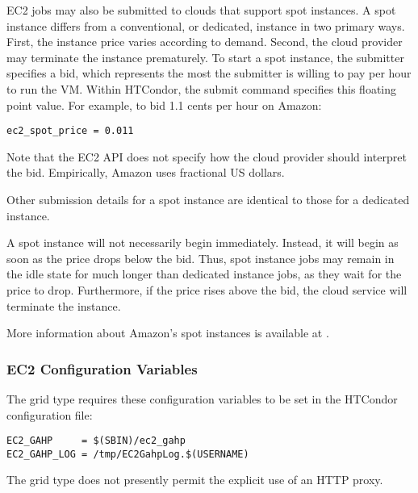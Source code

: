 EC2 jobs may also be submitted to clouds that support spot instances.
A spot instance differs from a conventional, or dedicated, instance in two
primary ways.
First, the instance price varies according to demand.
Second,
the cloud provider may terminate the instance prematurely.
To start a spot instance,
the submitter specifies a bid,
which represents the most the submitter is willing to pay per hour
to run the VM.
Within HTCondor, the submit command 
specifies this floating point value.
For example, 
to bid 1.1 cents per hour on Amazon:

\begin{verbatim}
ec2_spot_price = 0.011
\end{verbatim}

Note that the EC2 API does not specify how the cloud provider 
should interpret the bid.
Empirically, Amazon uses fractional US dollars.

Other submission details for a spot instance are identical to those
for a dedicated instance.

A spot instance will not necessarily begin immediately.
Instead, 
it will begin as soon as the price drops below the bid.
Thus, spot instance jobs
may remain in the idle state for much longer than dedicated instance jobs,
as they wait for the price to drop.
Furthermore, if the price rises above the bid, 
the cloud service will terminate the instance.

More information about Amazon's spot instances is available at
.


\subsubsection{\label{sec:Amazon-config}EC2 Configuration Variables}

The  grid type requires these configuration variables 
to be set in the HTCondor configuration file:

\footnotesize
\begin{verbatim}
EC2_GAHP     = $(SBIN)/ec2_gahp
EC2_GAHP_LOG = /tmp/EC2GahpLog.$(USERNAME)
\end{verbatim}
\normalsize

The  grid type does not presently permit the explicit use 
of an HTTP proxy.

